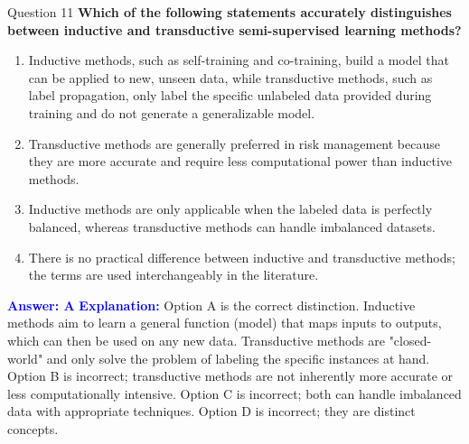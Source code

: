 \documentclass[8pt]{beamer}  %
\begin{document}
	\begin{frame}{Question 11}
		\textbf{Which of the following statements accurately distinguishes between inductive and transductive semi-supervised learning methods?}
		\begin{enumerate}
			\item Inductive methods, such as self-training and co-training, build a model that can be applied to new, unseen data, while transductive methods, such as label propagation, only label the specific unlabeled data provided during training and do not generate a generalizable model.
			\item Transductive methods are generally preferred in risk management because they are more accurate and require less computational power than inductive methods.
			\item Inductive methods are only applicable when the labeled data is perfectly balanced, whereas transductive methods can handle imbalanced datasets.
			\item There is no practical difference between inductive and transductive methods; the terms are used interchangeably in the literature.
		\end{enumerate}
		\vspace{0.2cm}
		\textcolor{blue}{\textbf{Answer: A}}
		\vspace{0.2cm}
		\textcolor{blue}{\textbf{Explanation:}} Option A is the correct distinction. Inductive methods aim to learn a general function (model) that maps inputs to outputs, which can then be used on any new data. Transductive methods are "closed-world" and only solve the problem of labeling the specific instances at hand. Option B is incorrect; transductive methods are not inherently more accurate or less computationally intensive. Option C is incorrect; both can handle imbalanced data with appropriate techniques. Option D is incorrect; they are distinct concepts.
	\end{frame}
	
\end{document}
